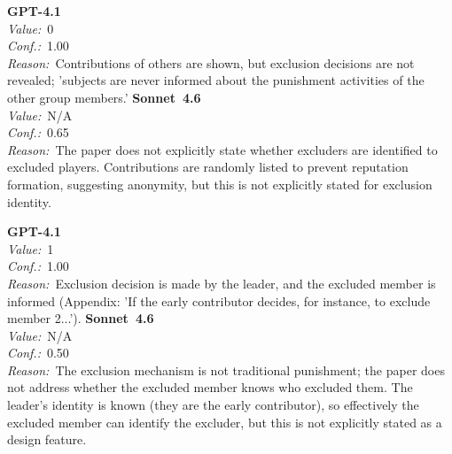 \documentclass[11pt,a4paper]{article}
\begin{document}
\begin{tcolorbox}[
  title={\textbf{CONFIG\_showPunishmentId} \textbar{} DOI: 10.1108\_01437720310502177 \textbar{} Cond.~2},
  colback=blue!3!white,
  colframe=blue!45!black,
  fonttitle=\small\sffamily,
  sidebyside,
  sidebyside align=top seam,
  lower separated=false,
  breakable,
  before upper={\small},
  before lower={\small},
]
\textbf{GPT-4.1}\\[2pt]
\textit{Value:}~0\\[3pt]
\textit{Conf.:}~1.00\\[3pt]
\textit{Reason:}~Contributions of others are shown, but exclusion decisions are not revealed; 'subjects are never informed about the punishment activities of the other group members.'
\tcblower
\textbf{Sonnet~4.6}\\[2pt]
\textit{Value:}~N/A\\[3pt]
\textit{Conf.:}~0.65\\[3pt]
\textit{Reason:}~The paper does not explicitly state whether excluders are identified to excluded players. Contributions are randomly listed to prevent reputation formation, suggesting anonymity, but this is not explicitly stated for exclusion identity.
\end{tcolorbox}

\begin{tcolorbox}[
  title={\textbf{CONFIG\_showPunishmentId} \textbar{} DOI: 10.1016\_j.jpubeco.2006.10.007 \textbar{} Cond.~3},
  colback=blue!3!white,
  colframe=blue!45!black,
  fonttitle=\small\sffamily,
  sidebyside,
  sidebyside align=top seam,
  lower separated=false,
  breakable,
  before upper={\small},
  before lower={\small},
]
\textbf{GPT-4.1}\\[2pt]
\textit{Value:}~1\\[3pt]
\textit{Conf.:}~1.00\\[3pt]
\textit{Reason:}~Exclusion decision is made by the leader, and the excluded member is informed (Appendix: 'If the early contributor decides, for instance, to exclude member 2...').
\tcblower
\textbf{Sonnet~4.6}\\[2pt]
\textit{Value:}~N/A\\[3pt]
\textit{Conf.:}~0.50\\[3pt]
\textit{Reason:}~The exclusion mechanism is not traditional punishment; the paper does not address whether the excluded member knows who excluded them. The leader's identity is known (they are the early contributor), so effectively the excluded member can identify the excluder, but this is not explicitly stated as a design feature.
\end{tcolorbox}
\end{document}
